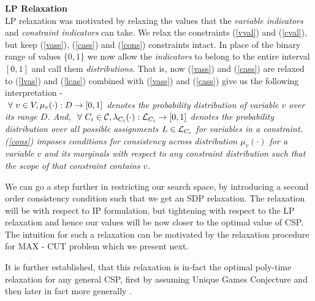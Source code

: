 \begin{discussion}{\bf LP Relaxation}\\
LP relaxation was motivated by relaxing the values that the \textit{variable indicators} and \textit{constraint indicators} can take. 
We relax the constraints (\ref{vval}) and (\ref{cval}), but keep (\ref{vass}), (\ref{cass})  and (\ref{cons}) constraints intact. 
In place of the binary range of values $\{0, 1\}$ we now allow the \textit{indicators} to belong to the entire interval $[0, 1]$ and call them \textit{distributions}.
That is, now (\ref{vass}) and (\ref{cass}) are relaxed to 
(\ref{lvas}) and (\ref{lcas}) combined with (\ref{vass}) and (\ref{cass}) give us the following interpretation - \\
\textit{$\ \forall \  v \in V, \mu_v(\cdot) : D \rightarrow [0, 1]$ denotes the \textit{probability distribution of variable $v$ over its range $D$}. And, $\ \forall \  C_i \in \mathcal{C}, \lambda_{C_i}(\cdot) : \mathcal{L}_{C_i} \rightarrow [0,1]$ denotes the \textit{probability distribution over all possible assignments $L \in \mathcal{L}_{C_i}$ for variables in a constraint}.  
(\ref{cons}) imposes conditions for consistency across \textit{distribution} $\mu_v(\cdot)$ for a variable $v$ and its marginals with respect to any constraint distribution such that the scope of that constraint contains $v$.}
\end{discussion}

We can go a step further in restricting our search space, by introducing a second order consistency condition such that we get an SDP relaxation. 
The relaxation will be with respect to IP formulation, but tightening with respect to the LP relaxation and hence our values will be now closer to the optimal value of CSP. 
The intuition for such a relaxation can be motivated by the relaxation procedure for MAX - CUT problem which we present next. 

It is further established, that this relaxation is in-fact the optimal poly-time relaxation for any general CSP, first by assuming Unique Games Conjecture \cite{Khot} and then later in fact more generally \cite{nphard}. 

